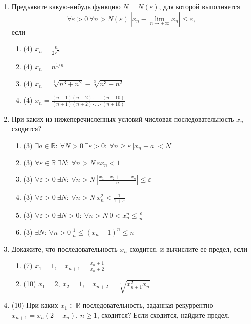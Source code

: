 \documentclass[a4paper]{article}
\def\eps{\varepsilon}
\begin{document}
\begin{enumerate}
    \item Предъявите какую-нибудь функцию $N = N(\eps)$, для которой выполняется
    \[
        \forall \eps>0\ \forall n> N(\eps)\ |x_n-\lim\limits_{n\to+\infty} x_n|\leq \eps,
    \]
    если
    \begin{multicols}{2}
    \begin{enumerate}
        \item (4) $x_n = \frac{n}{2^{\sqrt{n}}}$
        \item (4) $x_n = n^{1/n}$
        \item (4) $x_n = \sqrt[3]{n^3 + n^2} - \sqrt[3]{n^3 - n^2}$
        \item (4) $x_n = \frac{(n-1)(n-2)\cdot\dots\cdot (n-10)}{(n+1)(n+2)\cdot\dots\cdot(n+10)}$
    \end{enumerate}
    \end{multicols}
	
	\item При каких из нижеперечисленных условий числовая последовательность $x_n$ сходится?
	\begin{enumerate}
	    \item (3) $\exists a\in \mathbb R:\ \forall N>0\ \exists \eps>0:\ \forall n\geq\eps\ |x_n - a|<N$
	    \item (3) $\forall \eps\in \mathbb R\ \exists N:\ \forall n>N\ \eps x_n < 1$
	    \item (3) $\forall \eps>0\ \exists N:\ \forall n>N\ \left|\frac{x_1+x_2+\dots + x_n}{n}\right|\leq \eps$
	    \item (3) $\forall \eps>0\ \exists N:\ \forall n>N\ x_n^2<\frac{1}{1+\eps}$
	    \item (3) $\forall\eps>0\ \exists N>0:\ \forall n>N\ 0<x_n^n\leq \frac{\eps}{n}$
	    \item (3) $\exists N:\ \forall n>0\ \frac{1}{n}\leq (x_n - 1)^n \leq n$
	\end{enumerate}
    
    \item Докажите, что последовательность $x_n$ сходится, и вычислите ее предел, если
    \begin{multicols}{2}
    \begin{enumerate}
        \item (7) $x_1=1,\quad x_{n+1}=\frac{x_n + 1}{x_n + 2}$
        \item (10) $x_1 = 2,\ x_2 = 1,\quad x_{n+2} = \sqrt[3]{x_{n+1}^2x_n}$
    \end{enumerate}
    \end{multicols}
    
    \item (10) При каких $x_1\in\mathbb{R}$ последовательность, заданная рекуррентно $x_{n+1}=x_n(2-x_n)$, $n\geqslant1$, сходится? Если сходится, найдите предел.
\end{enumerate}
\end{document}
